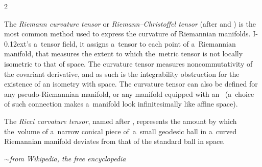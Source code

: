 \begin{changemargin}{2\parindent}{\parindent}
\bgroup %
\setlength{\parindent}{\negparindent}
\setlength{\parskip}{0.8mm minus0.2mm}
\small

\leavevmode{\indent}The \emph{Riemann curvature tensor} or \emph{Riemann\hbox{--}Christoffel tensor} (after \href{https://en.wikipedia.org/wiki/Bernhard_Riemann}{} and \href{https://en.wikipedia.org/wiki/Elwin_Bruno_Christoffel}{}) is the most common method used to express the curvature of Riemannian manifolds. I\kern-0.12ext’s a~tensor field, it assigns a~tensor to each point of a~Riemannian manifold, that measures the extent to which the~metric tensor is not locally isometric to that of  space. The curvature tensor measures noncommutativity of the covariant derivative, and as such is the integrability obstruction for the existence of an isometry with  space. The curvature tensor can also be defined for any pseudo-Riemannian manifold, or any manifold equipped with an~ (a~choice of such connection makes a~manifold look infinitesimally like affine  space).

The \emph{Ricci curvature tensor}, named after \href{https://en.wikipedia.org/wiki/Gregorio_Ricci-Curbastro}{}, represents the amount by which the~volume of a~narrow conical piece of~a~small geodesic ball in a~curved Riemannian manifold deviates from that of the standard ball in  space.

\vspace{.2em}
\hfill $\sim$\:\emph{from Wikipedia, the free encyclopedia}
\par
\egroup
\nopagebreak\vspace{.12em}
\end{changemargin}

